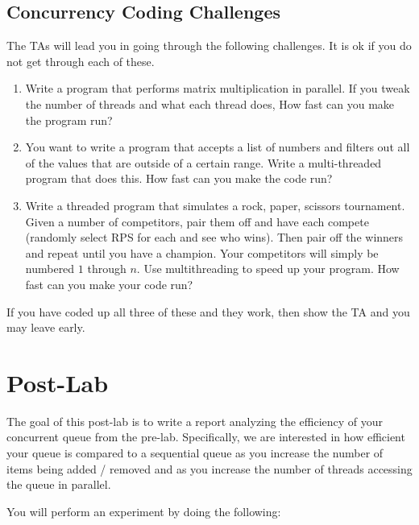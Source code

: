 \documentclass[paper=a4, fontsize=11pt, parskip=full]{scrartcl} %
\numberwithin{equation}{section} %
\numberwithin{figure}{section} %
\numberwithin{table}{section} %
\begin{document}
\subsection{Concurrency Coding Challenges}

The TAs will lead you in going through the following challenges. It is ok if you do not get through each of these.

\begin{enumerate}
	\item Write a program that performs matrix multiplication in parallel. If you tweak the number of threads and what each thread does, How fast can you make the program run?
	\item You want to write a program that accepts a list of numbers and filters out all of the values that are outside of a certain range. Write a multi-threaded program that does this. How fast can you make the code run?
	\item Write a threaded program that simulates a rock, paper, scissors tournament. Given a number of competitors, pair them off and have each compete (randomly select RPS for each and see who wins). Then pair off the winners and repeat until you have a champion. Your competitors will simply be numbered $1$ through $n$. Use multithreading to speed up your program. How fast can you make your code run? 
\end{enumerate}

If you have coded up all three of these and they work, then show the TA and you may leave early.




\newpage
\section{Post-Lab}

The goal of this post-lab is to write a report analyzing the efficiency of your concurrent queue from the pre-lab. Specifically, we are interested in how efficient your queue is compared to a sequential queue as you increase the number of items being added / removed and as you increase the number of threads accessing the queue in parallel.

You will perform an experiment by doing the following:
\end{document}
